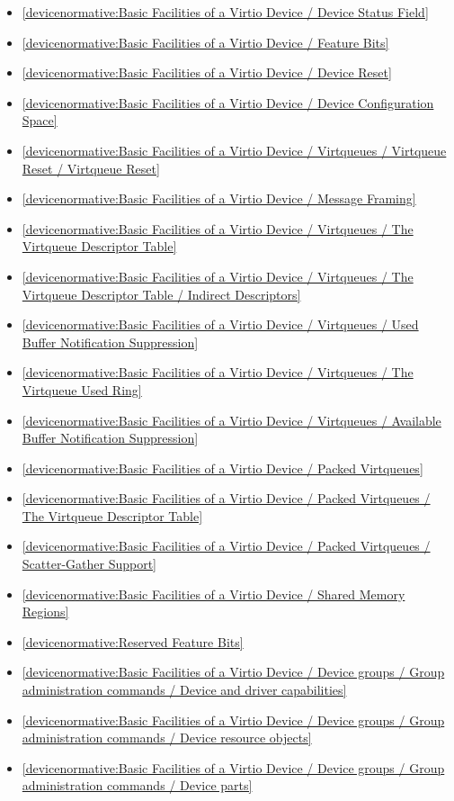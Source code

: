 \begin{itemize}
\item \ref{devicenormative:Basic Facilities of a Virtio Device / Device Status Field}
\item \ref{devicenormative:Basic Facilities of a Virtio Device / Feature Bits}
\item \ref{devicenormative:Basic Facilities of a Virtio Device / Device Reset}
\item \ref{devicenormative:Basic Facilities of a Virtio Device / Device Configuration Space}
\item \ref{devicenormative:Basic Facilities of a Virtio Device / Virtqueues / Virtqueue Reset / Virtqueue Reset}
\item \ref{devicenormative:Basic Facilities of a Virtio Device / Message Framing}
\item \ref{devicenormative:Basic Facilities of a Virtio Device / Virtqueues / The Virtqueue Descriptor Table}
\item \ref{devicenormative:Basic Facilities of a Virtio Device / Virtqueues / The Virtqueue Descriptor Table / Indirect Descriptors}
\item \ref{devicenormative:Basic Facilities of a Virtio Device / Virtqueues / Used Buffer Notification Suppression}
\item \ref{devicenormative:Basic Facilities of a Virtio Device / Virtqueues / The Virtqueue Used Ring}
\item \ref{devicenormative:Basic Facilities of a Virtio Device / Virtqueues / Available Buffer Notification Suppression}
\item \ref{devicenormative:Basic Facilities of a Virtio Device / Packed Virtqueues}
\item \ref{devicenormative:Basic Facilities of a Virtio Device / Packed Virtqueues / The Virtqueue Descriptor Table}
\item \ref{devicenormative:Basic Facilities of a Virtio Device / Packed Virtqueues / Scatter-Gather Support}
\item \ref{devicenormative:Basic Facilities of a Virtio Device / Shared Memory Regions}
\item \ref{devicenormative:Reserved Feature Bits}
\item \ref{devicenormative:Basic Facilities of a Virtio Device / Device groups / Group administration commands / Device and driver capabilities}
\item \ref{devicenormative:Basic Facilities of a Virtio Device / Device groups / Group administration commands / Device resource objects}
\item \ref{devicenormative:Basic Facilities of a Virtio Device / Device groups / Group administration commands / Device parts}
\end{itemize}

